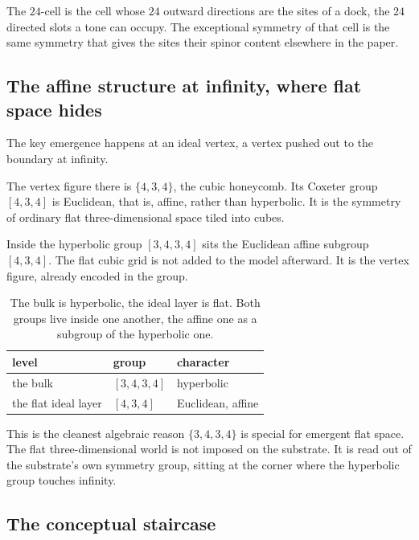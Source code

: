 The $24$-cell is the cell whose $24$ outward directions are the sites of a dock, the $24$ directed slots a tone can occupy. The exceptional symmetry of that cell is the same symmetry that gives the sites their spinor content elsewhere in the paper.

\subsection{The affine structure at infinity, where flat space hides}

The key emergence happens at an ideal vertex, a vertex pushed out to the boundary at infinity.

The vertex figure there is $\{4,3,4\}$, the cubic honeycomb. Its Coxeter group $[4,3,4]$ is Euclidean, that is, affine, rather than hyperbolic. It is the symmetry of ordinary flat three-dimensional space tiled into cubes.

\begin{principle}
Inside the hyperbolic group $[3,4,3,4]$ sits the Euclidean affine subgroup $[4,3,4]$. The flat cubic grid is not added to the model afterward. It is the vertex figure, already encoded in the group.
\end{principle}

\begin{table}[ht]
\centering
\begin{tabular}{@{}lll@{}}
\toprule
level & group & character \\
\midrule
the bulk & $[3,4,3,4]$ & hyperbolic \\
the flat ideal layer & $[4,3,4]$ & Euclidean, affine \\
\bottomrule
\end{tabular}
\caption{The bulk is hyperbolic, the ideal layer is flat. Both groups live inside one another, the affine one as a subgroup of the hyperbolic one.}
\label{tab:bulk-cusp}
\end{table}

This is the cleanest algebraic reason $\{3,4,3,4\}$ is special for emergent flat space. The flat three-dimensional world is not imposed on the substrate. It is read out of the substrate's own symmetry group, sitting at the corner where the hyperbolic group touches infinity.

\subsection{The conceptual staircase}

